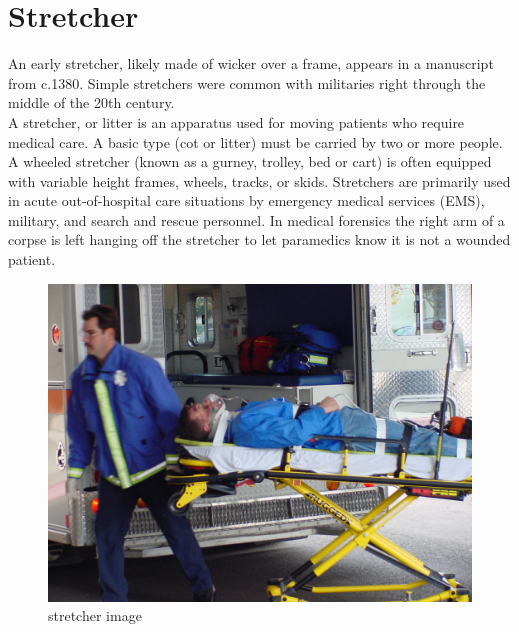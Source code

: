 \documentclass[12pt]{article}
\begin{document}
\clearpage

\section{Stretcher}
An early stretcher, likely made of wicker over a frame, appears in a manuscript from c.1380. Simple stretchers were common with militaries right through the middle of the 20th century.\\

A stretcher, or litter is an apparatus used for moving patients who require medical care. A basic type (cot or litter) must be carried by two or more people. A wheeled stretcher (known as a gurney, trolley, bed or cart) is often equipped with variable height frames, wheels, tracks, or skids. Stretchers are primarily used in acute out-of-hospital care situations by emergency medical services (EMS), military, and search and rescue personnel. In medical forensics the right arm of a corpse is left hanging off the stretcher to let paramedics know it is not a wounded patient.
\begin{figure}[h]
\centering
\includegraphics[scale=0.3]{stre.jpg}
\caption{stretcher image}
\end{figure}
\end{document}
